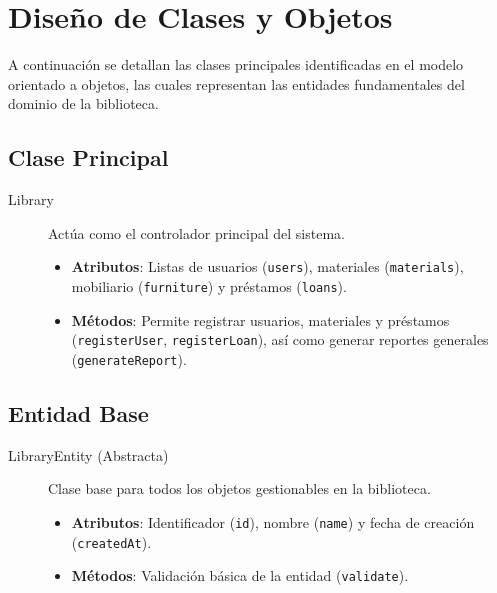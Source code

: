 \documentclass[stu, 12pt, letterpaper, donotrepeattitle]{apa7}
\begin{document}
    \section{Diseño de Clases y Objetos}

    A continuación se detallan las clases principales identificadas en el modelo orientado a objetos, las cuales representan las entidades fundamentales del dominio de la biblioteca.

    \subsection{Clase Principal}
    \begin{description}
        \item[Library] Actúa como el controlador principal del sistema.
        \begin{itemize}
            \item \textbf{Atributos}: Listas de usuarios (\texttt{users}), materiales (\texttt{materials}), mobiliario (\texttt{furniture}) y préstamos (\texttt{loans}).
            \item \textbf{Métodos}: Permite registrar usuarios, materiales y préstamos (\texttt{registerUser}, \texttt{registerLoan}), así como generar reportes generales (\texttt{generateReport}).
        \end{itemize}
    \end{description}

    \subsection{Entidad Base}
    \begin{description}
        \item[LibraryEntity (Abstracta)] Clase base para todos los objetos gestionables en la biblioteca.
        \begin{itemize}
            \item \textbf{Atributos}: Identificador (\texttt{id}), nombre (\texttt{name}) y fecha de creación (\texttt{createdAt}).
            \item \textbf{Métodos}: Validación básica de la entidad (\texttt{validate}).
        \end{itemize}
    \end{description}
\end{document}
